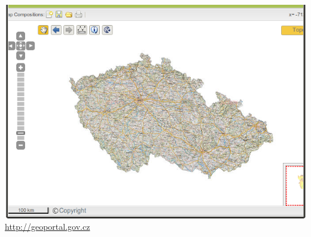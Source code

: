 \begin{frame}
\begin{center}
 {
    \includegraphics[width=.7\textwidth]{imgs/portal-inspire.png}\\
    \url{http://geoportal.gov.cz}
}



\end{center}
\end{frame}
